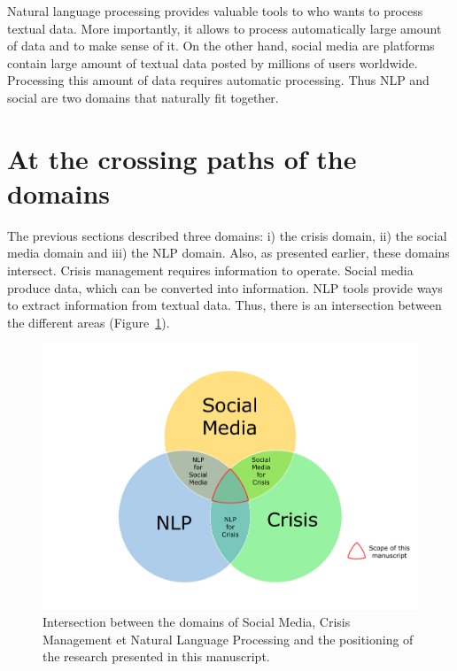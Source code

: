 Natural language processing provides valuable tools to who wants to process textual data.
More importantly, it allows to process automatically large amount of data and to make sense of it.
On the other hand, social media are platforms contain large amount of textual data posted by millions of users worldwide.
Processing this amount of data requires automatic processing.
Thus NLP and social are two domains that naturally fit together.

\section{At the crossing paths of the domains}
The previous sections described three domains: i) the crisis domain, ii) the social media domain and iii) the NLP domain.
Also, as presented earlier, these domains intersect.
Crisis management requires information to operate.
Social media produce data, which can be converted into information.
NLP tools provide ways to extract information from textual data.
Thus, there is an intersection between the different areas (Figure~\ref{context:venn-diagram-domains}).
\begin{figure}
    \centering
    \includegraphics[width=\textwidth]{figures/venn-diagram-domains.pdf}
    \caption{Intersection between the domains of Social Media, Crisis Management et Natural Language Processing and the positioning of the research presented in this manuscript.}
    \label{context:venn-diagram-domains}
\end{figure}

